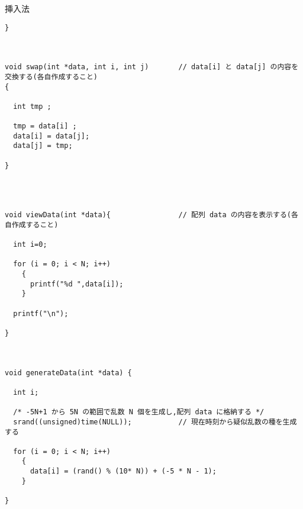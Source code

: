\documentclass[a4j,titlepage]{jarticle}
\begin{document}
\begin{breakitembox}[l]{挿入法}
\begin{verbatim}
}



void swap(int *data, int i, int j)       // data[i] と data[j] の内容を交換する(各自作成すること)
{

  int tmp ;

  tmp = data[i] ;
  data[i] = data[j];
  data[j] = tmp;
    
}




void viewData(int *data){                // 配列 data の内容を表示する(各自作成すること)

  int i=0;

  for (i = 0; i < N; i++)
    {
      printf("%d ",data[i]);
    }

  printf("\n");

}



void generateData(int *data) {

  int i; 
  
  /* -5N+1 から 5N の範囲で乱数 N 個を生成し,配列 data に格納する */
  srand((unsigned)time(NULL));           // 現在時刻から疑似乱数の種を生成する
  
  for (i = 0; i < N; i++)
    {
      data[i] = (rand() % (10* N)) + (-5 * N - 1);
    }

}
\end{verbatim}
\end{breakitembox}
\end{document}
